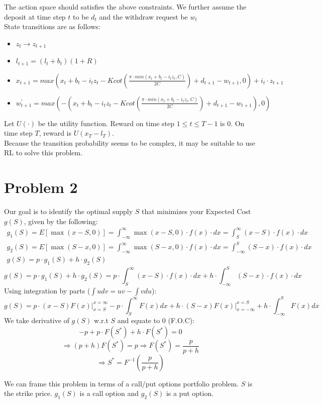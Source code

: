 \documentclass{article}
\begin{document}
The action space should satisfies the above constraints. We further assume the deposit at time step $t$ to be $d_{t}$ and the withdraw request be $w_{t}$ \\
State transitions are as follows:
\begin{itemize}
\item $z_{t}\rightarrow z_{t+1}$
\item $l_{t+1} = (l_{t}+b_{t})(1+R)$
\item $x_{t+1} = max(x_{t} + b_{t}-i_{t}z_{t}-K cot(\frac{\pi\cdot min(x_{t} + b_{t}-i_{t}z_{t}, C)}{2C}) + d_{t+1}-w_{t+1},0) + i_{t}\cdot z_{t+1}$
\item $w^{\prime}_{t+1} = max(-(x_{t} + b_{t}-i_{t}z_{t}-K cot(\frac{\pi\cdot min(x_{t} + b_{t}-i_{t}z_{t}, C)}{2C}) + d_{t+1}-w_{t+1}),0)$
\end{itemize}
Let $U(\cdot)$ be the utility function. Reward on time step $1\leq t\leq T-1$ is 0. On time step $T$, reward is $U(x_{T} -l_{T})$.\\
Because the transition probability seems to be complex, it may be suitable to use RL to solve this problem.
\section*{Problem 2}
Our goal is to identify the optimal supply $S$ that minimizes your Expected Cost $g(S)$, given by the following:
$$
\begin{gathered}
g_{1}(S)=E[\max (x-S, 0)]=\int_{-\infty}^{\infty} \max (x-S, 0) \cdot f(x) \cdot d x=\int_{S}^{\infty}(x-S) \cdot f(x) \cdot d x \\
g_{2}(S)=E[\max (S-x, 0)]=\int_{-\infty}^{\infty} \max (S-x, 0) \cdot f(x) \cdot d x=\int_{-\infty}^{S}(S-x) \cdot f(x) \cdot d x \\
g(S)=p \cdot g_{1}(S)+h \cdot g_{2}(S)
\end{gathered}
$$
$$g(S)=p \cdot g_{1}(S)+h \cdot g_{2}(S) = p \cdot \int_{S}^{\infty}(x-S) \cdot f(x) \cdot d x + h \cdot \int_{-\infty}^{S}(S-x) \cdot f(x) \cdot d x $$
Using integration by parts ($\int u dv = uv -\int v du$):
$$g(S) = p\cdot (x-S) F(x)\Biggr|_{x=S}^{x=\infty} -p \cdot \int_{S}^{\infty} F(x)dx + h \cdot(S-x)F(x)\Biggr|_{x=-\infty}^{x=S} + h\cdot \int^{S}_{-\infty} F(x)dx$$
We take derivative of $g(S)$ w.r.t $S$ and equate to 0 (F.O.C):
$$-p +p \cdot F(S^{*}) + h \cdot F(S^{*}) = 0 $$
$$\Rightarrow (p+h) F(S^{*}) = p\Rightarrow  F(S^{*}) = \frac{p}{p+h}$$
$$\Rightarrow S^{*} = F^{-1}(\frac{p}{p+h})$$

We can frame this problem in terms of a call/put options portfolio problem. $S$ is the strike price. $g_1(S)$ is a call option and $g_2(S)$ is a put option.
\end{document}
